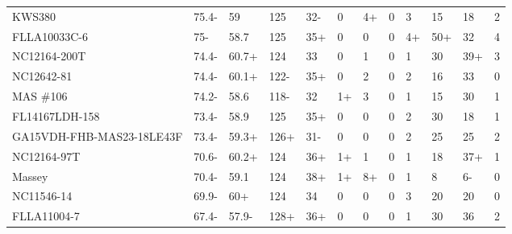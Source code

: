 \documentclass[12pt, letterpaper]{article}
\begin{document}
\begin{landscape}
\begin{ThreePartTable}
\begin{longtable}{llllllllllll}
  KWS380 & 75.4- & 59 & 125 & 32- & 0 & 4+ & 0 & 3 & 15 & 18 & 2 \\ 
  FLLA10033C-6 & 75- & 58.7 & 125 & 35+ & 0 & 0 & 0 & 4+ & 50+ & 32 & 4 \\ 
  NC12164-200T & 74.4- & 60.7+ & 124 & 33 & 0 & 1 & 0 & 1 & 30 & 39+ & 3 \\ 
  NC12642-81 & 74.4- & 60.1+ & 122- & 35+ & 0 & 2 & 0 & 2 & 16 & 33 & 0 \\ 
  MAS \#106 & 74.2- & 58.6 & 118- & 32 & 1+ & 3 & 0 & 1 & 15 & 30 & 1 \\ 
  FL14167LDH-158 & 73.4- & 58.9 & 125 & 35+ & 0 & 0 & 0 & 2 & 30 & 18 & 1 \\ 
  GA15VDH-FHB-MAS23-18LE43F & 73.4- & 59.3+ & 126+ & 31- & 0 & 0 & 0 & 2 & 25 & 25 & 2 \\ 
  NC12164-97T & 70.6- & 60.2+ & 124 & 36+ & 1+ & 1 & 0 & 1 & 18 & 37+ & 1 \\ 
  Massey & 70.4- & 59.1 & 124 & 38+ & 1+ & 8+ & 0 & 1 & 8 & 6- & 0 \\ 
  NC11546-14 & 69.9- & 60+ & 124 & 34 & 0 & 0 & 0 & 3 & 20 & 20 & 0 \\ 
  FLLA11004-7 & 67.4- & 57.9- & 128+ & 36+ & 0 & 0 & 0 & 1 & 30 & 36 & 2 \\ 
\end{longtable}
\end{ThreePartTable}

\newpage


\end{landscape}
\end{document}
